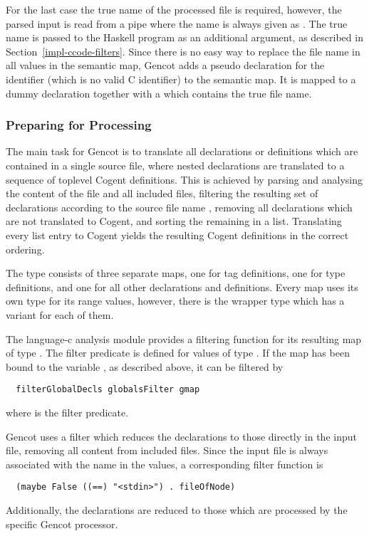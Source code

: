 For the last case the true name of the processed file is required, however, the parsed input is read from a pipe where
the name is always given as . The true name is passed to the Haskell program as an additional 
argument, as described in Section~\ref{impl-ccode-filters}. Since there is no easy way to replace the file name in
all  values in the semantic map, Gencot adds a pseudo declaration for the identifier 
(which is no valid C identifier) to the semantic map. It is mapped to a dummy declaration together with a 
which contains the true file name.

\subsubsection{Preparing for Processing}

The main task for Gencot is to translate all declarations or definitions which are contained in a single source file, where
nested declarations are translated to a sequence of toplevel Cogent definitions. This is achieved by parsing and analysing
the content of the file and all included files, filtering the resulting set of declarations according to the source file name
, removing all declarations which are not translated to Cogent, and sorting the remaining in a list. 
Translating every list entry to Cogent yields the resulting Cogent definitions in the correct ordering.

The type  consists of three separate maps, one for tag definitions, one for type definitions,
and one for all other declarations and definitions. Every map uses its own type for its range values, however, 
there is the wrapper type  which has a variant for each of them. 

The language-c analysis module provides a filtering function for its resulting map of type . The filter 
predicate is defined for values of type . If the map has been bound to the variable , 
as described above, it can be filtered by
\begin{verbatim}
  filterGlobalDecls globalsFilter gmap
\end{verbatim}
where  is the filter predicate.

Gencot uses a filter which reduces the declarations to those directly in the input file, removing all
content from included files. Since the input file is always associated with the name  in the 
values, a corresponding filter function is
\begin{verbatim}
  (maybe False ((==) "<stdin>") . fileOfNode)
\end{verbatim}
Additionally, the declarations are reduced to those which are processed by the specific Gencot processor.

